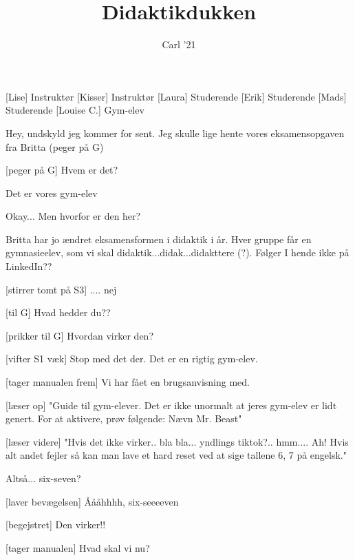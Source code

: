 \documentclass[a4paper,11pt]{article}
\title{Didaktikdukken}
\author{Carl '21}
\begin{document}
\maketitle

\begin{roles}
[Lise] Instruktør
[Kisser] Instruktør
[Laura] Studerende
[Erik] Studerende
[Mads] Studerende
[Louise C.] Gym-elev
\end{roles}

\begin{sketch}

 Hey, undskyld jeg kommer for sent. Jeg skulle lige hente vores eksamensopgaven fra Britta (peger på G)


[peger på G] Hvem er det?

 Det er vores gym-elev

 Okay... Men hvorfor er den her?

 Britta har jo ændret eksamensformen i didaktik i år. Hver gruppe får en gymnasieelev, som vi skal didaktik...didak...didakttere (?). Følger I hende ikke på LinkedIn??

[stirrer tomt på S3] .... nej 

[til G] Hvad hedder du??

[prikker til G] Hvordan virker den?

[vifter S1 væk] Stop med det der. Det er en rigtig gym-elev.

[tager manualen frem] Vi har fået en brugsanvisning med. 

[læser op] "Guide til gym-elever. Det er ikke unormalt at jeres gym-elev er lidt genert. For at aktivere, prøv følgende: Nævn Mr. Beast"


[læser videre] "Hvis det ikke virker.. bla bla... yndlings tiktok?.. hmm.... Ah! Hvis alt andet fejler så kan man lave et hard reset ved at sige tallene 6, 7 på engelsk."

 Altså... six-seven?

[laver bevægelsen] Åååhhhh, six-seeeeven

[begejstret] Den virker!!

[tager manualen] Hvad skal vi nu?


\end{sketch}
\end{document}
